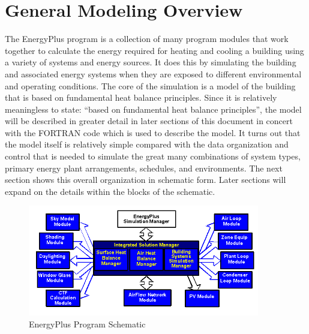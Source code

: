 \section{General Modeling Overview}\label{general-modeling-overview}

The EnergyPlus program is a collection of many program modules that work together to calculate the energy required for heating and cooling a building using a variety of systems and energy sources. It does this by simulating the building and associated energy systems when they are exposed to different environmental and operating conditions. The core of the simulation is a model of the building that is based on fundamental heat balance principles. Since it is relatively meaningless to state: ``based on fundamental heat balance principles'', the model will be described in greater detail in later sections of this document in concert with the FORTRAN code which is used to describe the model. It turns out that the model itself is relatively simple compared with the data organization and control that is needed to simulate the great many combinations of system types, primary energy plant arrangements, schedules, and environments. The next section shows this overall organization in schematic form. Later sections will expand on the details within the blocks of the schematic.

\begin{figure}[hbtp] %
\centering
\includegraphics[width=0.9\textwidth, height=0.9\textheight, keepaspectratio=true]{media/image1.png}
\caption{EnergyPlus Program Schematic \protect \label{fig:energyplus-program-schematic}}
\end{figure}

